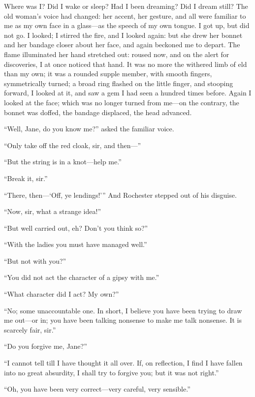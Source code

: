 Where was I? Did I wake or sleep? Had I been dreaming? Did I dream
still? The old woman's voice had changed: her accent, her gesture, and
all were familiar to me as my own face in a glass---as the speech of my
own tongue. I got up, but did not go. I looked; I stirred the fire,
and I looked again: but she drew her bonnet and her bandage closer about
her face, and again beckoned me to depart. The flame illuminated her
hand stretched out: roused now, and on the alert for discoveries, I at
once noticed that hand. It was no more the withered limb of eld than my
own; it was a rounded supple member, with smooth fingers, symmetrically
turned; a broad ring flashed on the little finger, and stooping forward,
I looked at it, and saw a gem I had seen a hundred times before. Again
I looked at the face; which was no longer turned from me---on the
contrary, the bonnet was doffed, the bandage displaced, the head
advanced.

\enquote{Well, Jane, do you know me?} asked the familiar voice.

\enquote{Only take off the red cloak, sir, and then---}

\enquote{But the string is in a knot---help me.}

\enquote{Break it, sir.}

\enquote{There, then---\enquote{Off, ye lendings!}} And \Mr{} Rochester stepped
out of his disguise.

\enquote{Now, sir, what a strange idea!}

\enquote{But well carried out, eh? Don't you think so?}

\enquote{With the ladies you must have managed well.}

\enquote{But not with you?}

\enquote{You did not act the character of a gipsy with me.}

\enquote{What character did I act? My own?}

\enquote{No; some unaccountable one. In short, I believe you have been
	trying to draw me out---or in; you have been talking nonsense to make me
	talk nonsense. It is scarcely fair, sir.}

\enquote{Do you forgive me, Jane?}

\enquote{I cannot tell till I have thought it all over. If, on
	reflection, I find I have fallen into no great absurdity, I shall try to
	forgive you; but it was not right.}

\enquote{Oh, you have been very correct---very careful, very sensible.}

